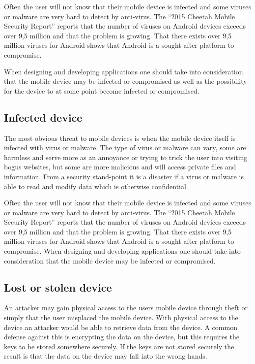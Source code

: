 Often the user will not know that their mobile device is infected and some viruses or malware are very hard to detect by anti-virus. The ``2015 Cheetah Mobile Security Report'' \cite{cheetahSec} reports that the number of viruses on Android devices exceeds over 9,5 million and that the problem is growing. That there exists over 9,5 million viruses for Android shows that Android is a sought after platform to compromise.

When designing and developing applications one should take into consideration that the mobile device may be infected or compromised as well as the possibility for the device to at some point become infected or compromised.


\iffalse %


\subsection{Infected device}
The most obvious threat to mobile devices is when the mobile device itself is infected with virus or malware. The type of virus or malware can vary, some are harmless and serve more as an annoyance or trying to trick the user into visiting bogus websites, but some are more malicious and will access private files and information. From a security stand-point it is a disaster if a virus or malware is able to read and modify data which is otherwise confidential.

Often the user will not know that their mobile device is infected and some viruses or malware are very hard to detect by anti-virus. The ``2015 Cheetah Mobile Security Report'' \cite{cheetahSec} reports that the number of viruses on Android devices exceeds over 9,5 million and that the problem is growing. That there exists over 9,5 million viruses for Android shows that Android is a sought after platform to compromise. When designing and developing applications one should take into consideration that the mobile device may be infected or compromised.

\subsection{Lost or stolen device}
An attacker may gain physical access to the users mobile device through theft or simply that the user misplaced the mobile device. With physical access to the device an attacker would be able to retrieve data from the device. A common defense against this is encrypting the data on the device, but this requires the keys to be stored somewhere securely. If the keys are not stored securely the result is that the data on the device may fall into the wrong hands.

